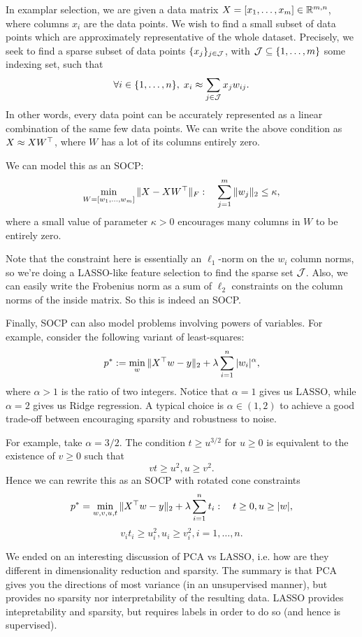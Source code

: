 \documentclass[11 pt]{scrartcl}
\begin{document}
\begin{example}
    In examplar selection, we are given a data matrix $X = [x_1,\dots, x_m]\in \mathbb R^{m,n}$, where columns $x_i$ are the data points. 
    We wish to find a small subset of data points which are approximately representative of the whole dataset. 
    Precisely, we seek to find a sparse subset of data points $\{x_j\}_{j\in \mathcal J}$, with $\mathcal J\subseteq \{1,\dots, m\}$ some indexing set, such that 
    \[ \forall i\in \{1, \dots, n\}, \; x_i \approx \sum_{j\in \mathcal J} x_j w_{ij}.\] 
    In other words, every data point can be accurately represented as a linear combination of the same few data points. 
    We can write the above condition as $X \approx XW^\top$, where $W$ has a lot of its columns entirely zero. 

    We can model this as an SOCP: 
    \[ \min_{W = [w_1, \dots, w_m]} \|X - XW^\top \|_F : \quad \sum_{j=1}^m \|w_j\|_2 \leq \kappa,\] 
    where a small value of parameter $\kappa > 0$ encourages many columns in $W$ to be entirely zero. 

    Note that the constraint here is essentially an $\ell_1$-norm on the $w_i$ column norms, so we're doing a LASSO-like feature selection to find the sparse set $\mathcal J$. 
    Also, we can easily write the Frobenius norm as a sum of $\ell_2$ constraints on the column norms of the inside matrix.
    So this is indeed an SOCP.
\end{example}

Finally, SOCP can also model problems involving powers of variables. 
For example, consider the following variant of least-squares: 
\[ p^* := \min_w \|X^\top w - y\|_2 + \lambda \sum_{i=1}^n |w_i|^\alpha, \] 
where $\alpha > 1$ is the ratio of two integers. 
Notice that $\alpha = 1$ gives us LASSO, while $\alpha = 2$ gives us Ridge regression. 
A typical choice is $\alpha \in (1,2)$ to achieve a good trade-off between encouraging sparsity and robustness to noise. 

For example, take $\alpha = 3/2$. 
The condition $t \geq u^{3/2}$ for $u \geq 0$ is equivalent to the existence of $v\geq 0$ such that 
\[ vt \geq u^2, u \geq v^2.\] 
Hence we can rewrite this as an SOCP with rotated cone constraints 
\[ p^* = \min_{w,v,u,t} \|X^\top w - y\|_2 + \lambda \sum_{i=1}^n t_i : \quad t\geq 0, u\geq |w|,\] 
\[ v_i t_i\geq u_i^2, u_i \geq v_i^2, i = 1,\dots, n.\] 

We ended on an interesting discussion of PCA vs LASSO, i.e. how are they different in dimensionality reduction and sparsity. 
The summary is that PCA gives you the directions of most variance (in an unsupervised manner), but provides no sparsity nor interpretability of the resulting data. 
LASSO provides intepretability and sparsity, but requires labels in order to do so (and hence is supervised). 
\end{document}
